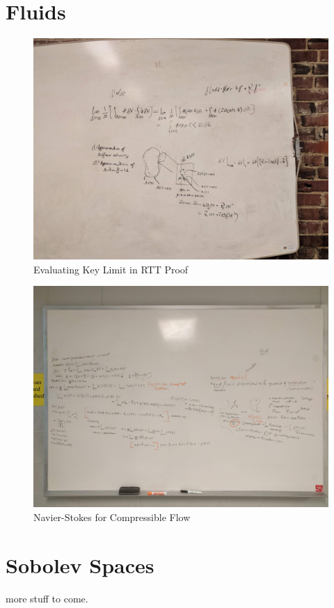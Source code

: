 \appendix

\chapter{Fluids}
\begin{figure}[h!]
    \centering
    \includegraphics[width=1.0\textwidth]{fig/RTT.jpg}
    \caption{Evaluating Key Limit in RTT Proof}
    \label{fig:rtt}
\end{figure}

\begin{figure}[h!]
    \centering
    \includegraphics[width=1.0\textwidth]{fig/NS.jpg}
    \caption{Navier-Stokes for Compressible Flow}
    \label{fig:ns}
\end{figure}

\chapter{Sobolev Spaces}
more stuff to come.